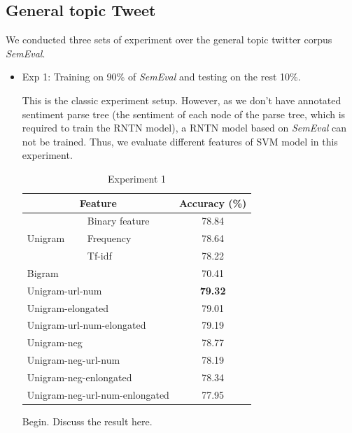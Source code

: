 \subsection{General topic Tweet}
We conducted three sets of experiment over the general topic twitter corpus \textit{SemEval}. 
\begin{itemize}
\item Exp 1: Training on 90\% of \textit{SemEval} and testing on the rest 10\%. 

This is the classic experiment setup. However, as we don't have annotated sentiment parse tree  (the sentiment of each node of the parse tree, which is required to train the RNTN model), a RNTN model based on \textit{SemEval} can not be trained. Thus, we evaluate different features of SVM model in this experiment. 

\begin{table}[H]
  \begin{center}
    \begin{tabular}{llc}\hline
     \multicolumn{2}{c}{Feature} & Accuracy (\%)     \\\hline
     \multirow{3}{*}{Unigram}    & Binary feature  &  78.84  \\ 
                                 & Frequency       &  78.64  \\ 
                                 & Tf-idf          &  78.22 \\
     \multicolumn{2}{l}{Bigram}                    &  70.41 \\    
     \multicolumn{2}{l}{Unigram-url-num}           &  \textbf{79.32} \\
     \multicolumn{2}{l}{Unigram-elongated}         &  79.01 \\
     \multicolumn{2}{l}{Unigram-url-num-elongated} &  79.19 \\
     \multicolumn{2}{l}{Unigram-neg}               &  78.77 \\
     \multicolumn{2}{l}{Unigram-neg-url-num}       &  78.19 \\
     \multicolumn{2}{l}{Unigram-neg-enlongated}    &  78.34 \\
     \multicolumn{2}{l}{Unigram-neg-url-num-enlongated}  &  77.95 \\\hline      
    \end{tabular}
    \end{center}
    \caption{\label{exp5_1} Experiment 1}
\end{table}

Begin. \vspace{5cm} Discuss the result here. 



\end{itemize}
